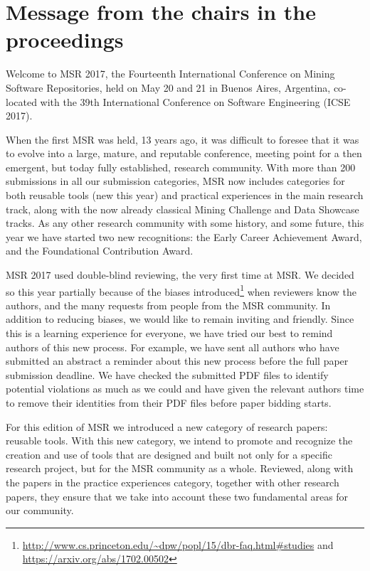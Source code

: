 \documentclass[a4paper]{report}
\begin{document}
\chapter{Message from the chairs in the proceedings}

Welcome to MSR 2017, the Fourteenth International Conference on Mining Software Repositories, held on May 20 and 21 in Buenos Aires, Argentina, co-located with the 39th International Conference on Software Engineering (ICSE 2017).

When the first MSR was held, 13 years ago, it was difficult to foresee that it was to evolve into a large, mature, and reputable conference, meeting point for a then emergent, but today fully established, research community. With more than 200 submissions in all our submission categories, MSR now includes categories for both reusable tools (new this year) and practical experiences in the main research track, along with the now already classical Mining Challenge and Data Showcase tracks. As any other research community with some history, and some future, this year we have started two new recognitions: the Early Career Achievement Award, and the Foundational Contribution Award.

MSR 2017 used double-blind reviewing, the very first time at MSR. We decided so this year partially because of the biases introduced\footnote{\url{http://www.cs.princeton.edu/~dpw/popl/15/dbr-faq.html#studies} and \url{https://arxiv.org/abs/1702.00502}} when reviewers know the authors, and the many requests from people from the MSR community. In addition to reducing biases, we would like to remain inviting and friendly. Since this is a learning experience for everyone, we have tried our best to remind authors of this new process. For example, we have sent all authors who have submitted an abstract a reminder about this new process before the full paper submission deadline. We have checked the submitted PDF files to identify potential violations as much as we could and have given the relevant authors time to remove their identities from their PDF files before paper bidding starts. 

For this edition of MSR we introduced a new category of research papers: reusable tools. With this new category, we intend to promote and recognize the creation and use of tools that are designed and built not only for a specific research project, but for the MSR community as a whole. Reviewed, along with the papers in the practice experiences category, together with other research papers, they ensure that we take into account these two fundamental areas for our community.
\end{document}
